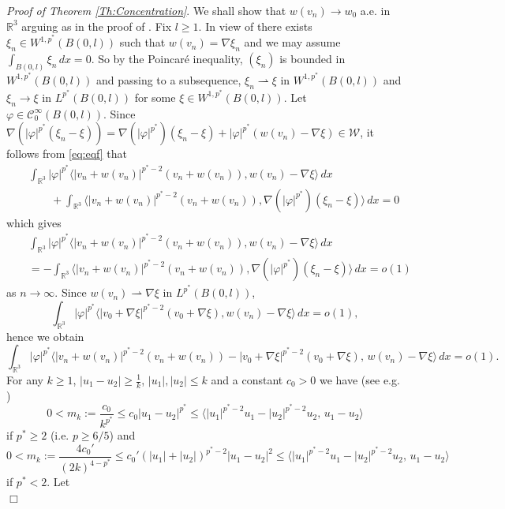 \documentclass[12pt,leqno,twoside]{amsart}
\newenvironment{altproof}[1]
{\noindent%
{\em Proof of {#1}}.}
{\nopagebreak\mbox{}\hfill $\Box$\par\addvspace{0.5cm}}
\newcommand{\vp}{\varphi}
\def\R{\mathbb{R}}
\def\rh{\rightharpoonup}
\newcommand{\cC}{{\mathcal C}}
\newcommand{\cW}{{\mathcal W}}
\def\rh{\rightharpoonup}
\def\vp{\varphi}
\numberwithin{equation}{section}
\begin{document}
\begin{altproof}{Theorem \ref{Th:Concentration}}
	We shall show that 
	$w(v_n)\to w_0$ a.e. in $\R^3$ arguing as in the proof of \cite[Theorem 3.1]{MedSz}.
	Fix $l\geq 1$.
	In view of \cite[Lemma 1.1]{Le} there exists $\xi_n\in W^{1,p^*}(B(0,l))$ such that $w(v_n)=\nabla\xi_n$ and we may assume $\int_{B(0,l)}\xi_n\,dx = 0$. So by the Poincar\'e inequality, $(\xi_n)$ is bounded in $W^{1,p^*}(B(0,l))$
	and passing to a subsequence, $\xi_n\rh \xi$ in $W^{1,p^*}(B(0,l))$ and $\xi_n\to \xi$ in $L^{p^*}(B(0,l))$ for some $\xi\in W^{1,p^*}(B(0,l))$. 
	Let $\vp\in\cC_0^{\infty}(B(0,l))$.
	Since $\nabla (|\vp|^{p^*}(\xi_n-\xi)) = \nabla(|\vp|^{p^*})(\xi_n-\xi) + |\vp|^{p^*}(w(v_n)-\nabla\xi) \in\cW$, it follows from \eqref{eq:eqf} that
	\begin{eqnarray*}
	&& \int_{\R^3}|\vp|^{p^*}\langle |v_n+w(v_n)|^{p^*-2}(v_n+w(v_n)),w(v_n)-\nabla\xi\rangle \,dx \\  
	&& \qquad + \int_{\R^3}\langle |v_n+w(v_n)|^{p^*-2}(v_n+w(v_n)),\nabla (|\vp|^{p^*})(\xi_n-\xi)\rangle\,dx = 0
	\end{eqnarray*}
	which gives
	\begin{eqnarray*}
		&&\int_{\R^3}|\vp|^{p^*}\langle |v_n+w(v_n)|^{p^*-2}(v_n+w(v_n)),w(v_n)-\nabla\xi\rangle \,dx\\ 
		&&=-\int_{\R^3}\langle |v_n+w(v_n)|^{p^*-2}(v_n+w(v_n)),\nabla (|\vp|^{p^*})(\xi_n-\xi)\rangle\,dx=o(1)
	\end{eqnarray*}
	as $n\to\infty$. Since $w(v_n)\rh \nabla\xi$ in $L^{p^*}(B(0,l))$,  
	$$
	\int_{\R^3}|\vp|^{p^*}\langle |v_0+\nabla\xi|^{p^*-2}(v_0+\nabla\xi),w(v_n)-\nabla\xi\rangle \,dx=o(1),
	$$
	hence we obtain
	\begin{equation} \label{eq:est1}
	\int_{\R^3}|\vp|^{p^*}\langle |v_n+w(v_n)|^{p^*-2}(v_n+w(v_n))-|v_0+\nabla\xi|^{p^*-2}(v_0+\nabla\xi),\,  w(v_n)-\nabla\xi\rangle \,dx =o(1).
	\end{equation}
	For any $k\geq 1$, $|u_1-u_2|\ge \frac1k$, $|u_1|, |u_2| \le k$ and a constant $c_0>0$ we have (see e.g. \cite{Simon})
	\begin{equation} \label{mk}
	0 < m_{k} := \frac{c_0}{k^{p^*}} \le c_0|u_1-u_2|^{p^*} \le \langle |u_1|^{p^*-2}u_1-|u_2|^{p^*-2}u_2,\, u_1-u_2\rangle
	\end{equation}
	if $p^*\ge 2$ (i.e. $p\ge 6/5$) and
	\begin{equation} \label{mk2}
	0 < m_{k} :=\frac{4c_0'}{(2k)^{4-p^*}} \le c_0'(|u_1|+|u_2|)^{p^*-2}|u_1-u_2|^2 \le \langle |u_1|^{p^*-2}u_1-|u_2|^{p^*-2}u_2,\, u_1-u_2\rangle
	\end{equation}
	if $p^*<2$.
	Let 
	$$
$$
\end{altproof}
\end{document}
